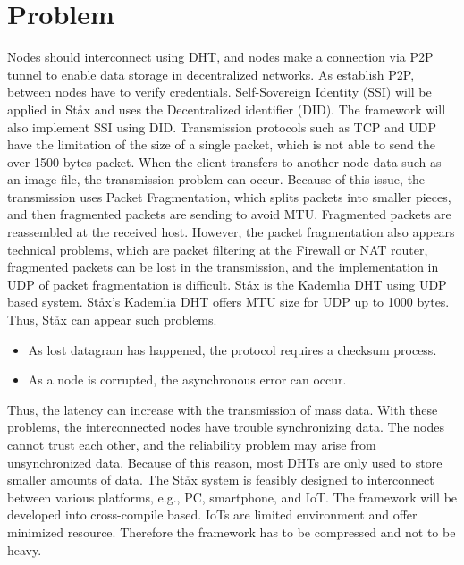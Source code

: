 \documentclass{article}
\begin{document}
\section{Problem}

Nodes should interconnect using DHT, and nodes make a connection via P2P tunnel to enable data storage in decentralized networks. As establish P2P, between nodes have to verify credentials. Self-Sovereign Identity (SSI)\cite{tobin2016inevitable} will be applied in St\aa x and uses the Decentralized identifier (DID)\cite{sabadello2018introduction}. The framework will also implement SSI using DID. Transmission protocols such as TCP and UDP have the limitation of the size of a single packet, which is not able to send the over 1500 bytes packet. When the client transfers to another node data such as an image file, the transmission problem can occur. Because of this issue, the transmission uses Packet Fragmentation, which splits packets into smaller pieces, and then fragmented packets are sending to avoid MTU. Fragmented packets are reassembled at the received host. However, the packet fragmentation also appears technical problems, which are packet filtering at the Firewall or NAT router, fragmented packets can be lost in the transmission, and the implementation in UDP of packet fragmentation is difficult. St\aa x is the Kademlia DHT using UDP based system. St\aa x's Kademlia DHT offers MTU size for UDP up to 1000 bytes. Thus, St\aa x can appear such problems.
\begin{itemize}
	\item As lost datagram has happened, the protocol requires a checksum process.
	\item As a node is corrupted, the asynchronous error can occur.
\end{itemize}
Thus, the latency can increase with the transmission of mass data. With these problems, the interconnected nodes have trouble synchronizing data. The nodes cannot trust each other, and the reliability problem may arise from unsynchronized data. Because of this reason, most DHTs are only used to store smaller amounts of data. The St\aa x system is feasibly designed to interconnect between various platforms, e.g., PC, smartphone, and IoT. The framework will be developed into cross-compile based. IoTs are limited environment and offer minimized resource. Therefore the framework has to be compressed and not to be heavy.
\end{document}
